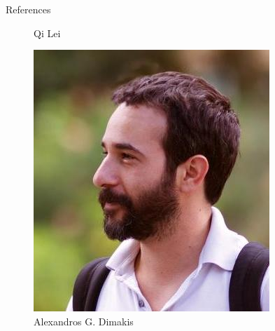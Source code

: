 \documentclass{beamer}
\begin{document}
\begin{frame}{References}
\begin{figure}
\begin{minipage}[t]{.2\paperwidth}
        \caption{Qi Lei}
    \end{minipage}
    \begin{minipage}[t]{.2\paperwidth}
        \centering
        \includegraphics[width=\textwidth]{res/alexdimakis_sm.jpg}
        \caption{Alexandros G. Dimakis}
    \end{minipage}
    \begin{minipage}[t]{.2\paperwidth}
        \centering

\end{minipage}
\end{figure}
\end{frame}
\end{document}
